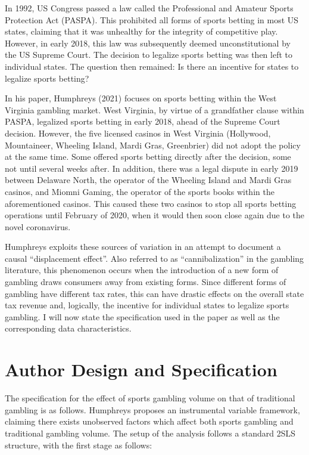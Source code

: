 \documentclass{article}
\begin{document}
	In 1992, US Congress passed a law called the Professional and Amateur Sports Protection Act (PASPA). This prohibited all forms of sports betting in most US states, claiming that it was unhealthy for the integrity of competitive play. However, in early 2018, this law was subsequently deemed unconstitutional by the US Supreme Court. The decision to legalize sports betting was then left to individual states. The question then remained: Is there an incentive for states to legalize sports betting?

	In his paper, Humphreys (2021)\cite{Humphreys2021} focuses on sports betting within the West Virginia gambling market. West Virginia, by virtue of a grandfather clause within PASPA, legalized sports betting in early 2018, ahead of the Supreme Court decision. However, the five licensed casinos in West Virginia (Hollywood, Mountaineer, Wheeling Island, Mardi Gras, Greenbrier) did not adopt the policy at the same time. Some offered sports betting directly after the decision, some not until several weeks after. In addition, there was a legal dispute in early 2019 between Delaware North, the operator of the Wheeling Island and Mardi Gras casinos, and Miomni Gaming, the operator of the sports books within the aforementioned casinos. This caused these two casinos to stop all sports betting operations until February of 2020, when it would then soon close again due to the novel coronavirus.

	Humphreys exploits these sources of variation in an attempt to document a causal “displacement effect”\cite{Humphreys2021}. Also referred to as “cannibalization” in the gambling literature, this phenomenon occurs when the introduction of a new form of gambling draws consumers away from existing forms. Since different forms of gambling have different tax rates, this can have drastic effects on the overall state tax revenue and, logically, the incentive for individual states to legalize sports gambling. I will now state the specification used in the paper as well as the corresponding data characteristics.


\section*{Author Design and Specification}

The specification for the effect of sports gambling volume on that of traditional gambling is as follows. Humphreys proposes an instrumental variable framework, claiming there exists unobserved factors which affect both sports gambling and traditional gambling volume. The setup of the analysis follows a standard 2SLS structure, with the first stage as follows:
\end{document}
